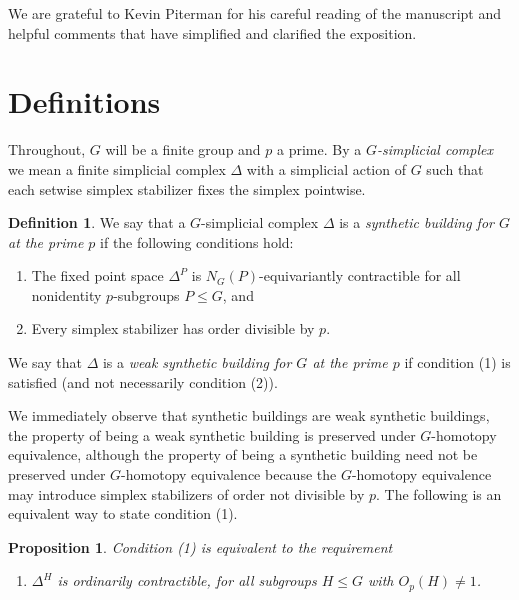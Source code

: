 \documentclass[12pt]{amsart}
\theoremstyle{plain}
\newtheorem{proposition}[theorem]{Proposition}
\theoremstyle{definition}
\newtheorem{definition}[theorem]{Definition}
\theoremstyle{remark}
\numberwithin{equation}{section}
\begin{document}
We are grateful to Kevin Piterman for his careful reading of the manuscript and helpful comments that have simplified and clarified the exposition.

\section{Definitions}
\label{definitions-section}
Throughout, $G$ will be a finite group and $p$ a prime. By a \textit{$G$-simplicial complex} we mean a finite simplicial complex $\Delta$ with a simplicial action of $G$ such that each setwise simplex stabilizer fixes the simplex pointwise.

\begin{definition}
\label{synthetic-building-definition}
We say that a $G$-simplicial complex $\Delta$ is a \textit{synthetic building for $G$ at the prime $p$} if the following conditions hold:
    \begin{enumerate}
        \item The fixed point space $\Delta^P$ is $N_G(P)$-equivariantly contractible for all nonidentity $p$-subgroups $P\leq G$, and
        \item Every simplex stabilizer has order divisible by $p$.
    \end{enumerate}
We say that $\Delta$ is a \textit{weak synthetic building for $G$ at the prime $p$} if condition (1) is satisfied (and not necessarily condition (2)).
\end{definition}

We immediately observe that synthetic buildings are weak synthetic buildings, the property of being a weak synthetic building is preserved under $G$-homotopy equivalence, although the property of being a synthetic building need not be preserved under $G$-homotopy equivalence because the $G$-homotopy equivalence may introduce simplex stabilizers of order not divisible by $p$. The following is an equivalent way to state condition (1).

\begin{proposition}
\label{equiv-condition-proposition}
    Condition (1) is equivalent to the requirement 
\begin{enumerate}
    \item [(1$'$)] $\Delta^H$ is ordinarily contractible, for all subgroups $H\le G$ with $O_p(H)\ne 1$.
\end{enumerate}
\end{proposition}
\end{document}
